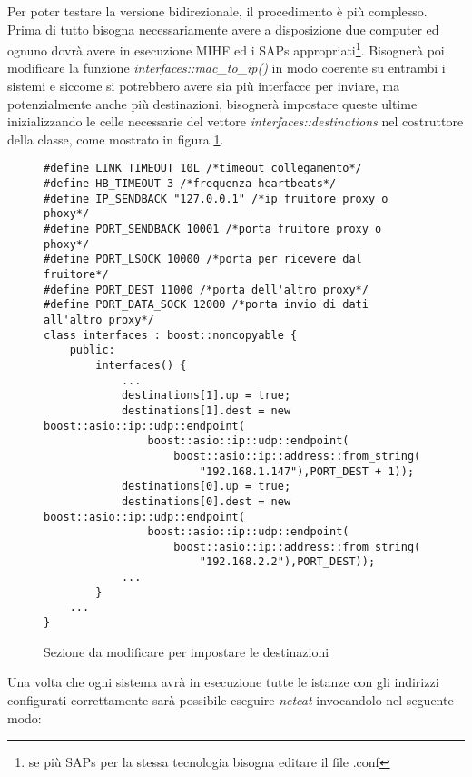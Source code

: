 Per poter testare la versione bidirezionale, il procedimento è più complesso. Prima di tutto bisogna necessariamente avere a disposizione due computer ed ognuno dovrà avere in esecuzione MIHF ed i SAPs appropriati\footnote{se più SAPs per la stessa tecnologia bisogna editare il file .conf}. Bisognerà poi modificare la funzione {\em interfaces::mac\_to\_ip()} in modo coerente su entrambi i sistemi e siccome si potrebbero avere sia più interfacce per inviare, ma potenzialmente anche più destinazioni, bisognerà impostare queste ultime inizializzando le celle necessarie del vettore {\em interfaces::destinations} nel costruttore della classe, come mostrato in figura \ref{fig:destinationcode}.
\begin{figure}
\begin{verbatim}
#define LINK_TIMEOUT 10L /*timeout collegamento*/
#define HB_TIMEOUT 3 /*frequenza heartbeats*/
#define IP_SENDBACK "127.0.0.1" /*ip fruitore proxy o phoxy*/
#define PORT_SENDBACK 10001 /*porta fruitore proxy o phoxy*/
#define PORT_LSOCK 10000 /*porta per ricevere dal fruitore*/
#define PORT_DEST 11000 /*porta dell'altro proxy*/
#define PORT_DATA_SOCK 12000 /*porta invio di dati all'altro proxy*/
class interfaces : boost::noncopyable {
    public:
        interfaces() {
            ...
            destinations[1].up = true;
            destinations[1].dest = new boost::asio::ip::udp::endpoint(
                boost::asio::ip::udp::endpoint(
                    boost::asio::ip::address::from_string(
                        "192.168.1.147"),PORT_DEST + 1));
            destinations[0].up = true;
            destinations[0].dest = new boost::asio::ip::udp::endpoint(
                boost::asio::ip::udp::endpoint(
                    boost::asio::ip::address::from_string(
                        "192.168.2.2"),PORT_DEST));
            ...
        }
    ...
}
\end{verbatim}
\caption{Sezione da modificare per impostare le destinazioni}
\label{fig:destinationcode}
\end{figure}
Una volta che ogni sistema avrà in esecuzione tutte le istanze con gli indirizzi configurati correttamente sarà possibile eseguire {\em netcat} invocandolo nel seguente modo:
\\
